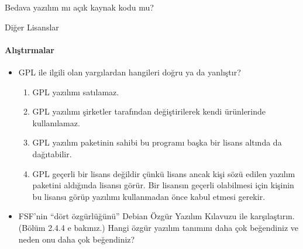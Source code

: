 \documentclass[10pt,a5paper]{book}
\begin{document}
\begin{section}{Bedava yazılım mı açık kaynak kodu mu?}
\begin{subsection}{Diğer Lisanslar}
\paragraph{Alıştırmalar}{
\begin{itemize}
 \item GPL ile ilgili olan yargılardan hangileri doğru ya da yanlıştır?
 \begin{enumerate}
 \item GPL yazılımı satılamaz.
 \item GPL yazılımı şirketler tarafından değiştirilerek kendi ürünlerinde kullanılamaz.
 \item GPL yazılım paketinin sahibi bu programı başka bir lisans altında da dağıtabilir.
 \item GPL geçerli bir lisans değildir çünkü lisans ancak kişi sözü edilen yazılım paketini aldığında lisansı görür. Bir lisansın geçerli olabilmesi için kişinin bu lisansı görüp yazılımı kullanmadan önce kabul etmesi gerekir.
 \end{enumerate}
 \item FSF'nin “dört özgürlüğünü” Debian Özgür Yazılım Kılavuzu ile karşılaştırın. (Bölüm 2.4.4 e bakınız.) Hangi özgür yazılım tanımını daha çok beğendiniz ve neden onu daha çok beğendiniz?
\end{itemize}}
\end{subsection}
\end{section}
\end{document}
